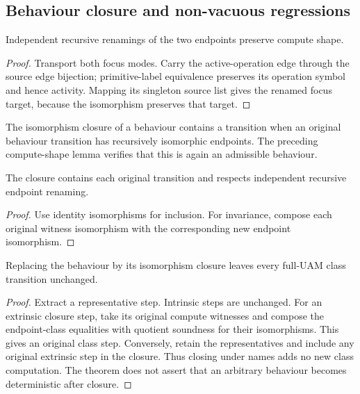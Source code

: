

\subsection{Behaviour closure and non-vacuous regressions}
\begin{lemma}
Independent recursive renamings of the two endpoints preserve compute shape.
\end{lemma}
\begin{proof}
Transport both focus modes. Carry the active-operation edge through the source
edge bijection; primitive-label equivalence preserves its operation symbol and
hence activity. Mapping its singleton source list gives the renamed focus
target, because the isomorphism preserves that target.
\end{proof}


\begin{definition}
The isomorphism closure of a behaviour contains a transition when an original
behaviour transition has recursively isomorphic endpoints. The preceding
compute-shape lemma verifies that this is again an admissible behaviour.
\end{definition}
\begin{lemma}
The closure contains each original transition and respects independent
recursive endpoint renaming.
\end{lemma}
\begin{proof}
Use identity isomorphisms for inclusion. For invariance, compose each original
witness isomorphism with the corresponding new endpoint isomorphism.
\end{proof}




\begin{theorem}
Replacing the behaviour by its isomorphism closure leaves every full-UAM
class transition unchanged.
\end{theorem}
\begin{proof}
Extract a representative step. Intrinsic steps are unchanged. For an extrinsic
closure step, take its original compute witnesses and compose the endpoint-class
equalities with quotient soundness for their isomorphisms. This gives an original
class step. Conversely, retain the representatives and include any original
extrinsic step in the closure. Thus closing under names adds no new class
computation. The theorem does not assert that an arbitrary behaviour becomes
deterministic after closure.
\end{proof}

